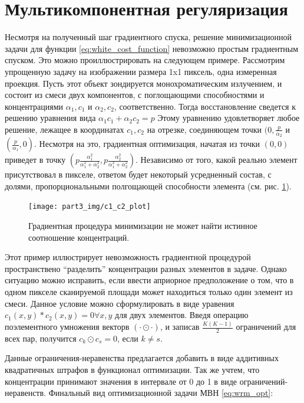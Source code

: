 \section{Мультикомпонентная регуляризация}
Несмотря на полученный шаг градиентного спуска, решение минимизационной задачи для функции \eqref{eq:white_cost_function} невозможно простым градиентным спуском.
Это можно проиллюстрировать на следующем примере.
Рассмотрим упрощенную задачу на изображении размера 1x1 пиксель, одна измеренная проекция. 
Пусть этот объект зондируется монохроматическим излучением, и состоит из смеси двух компонентов, с поглощающими способностями и концентрациями $\alpha_1, c_1$ и $\alpha_2, c_2$, соответственно.
Тогда восстановление сведется к решению уравнения вида $ \alpha_1 c_1 + \alpha_2 c_2 = p$
Этому уравнению удовлетворяет любое решение, лежащее в координатах $c_1, c_2$ на отрезке, соединяющем точки $(0, \frac{p}{\alpha_2}$ и $(\frac{p}{\alpha_1}, 0)$.
Несмотря на это, градиентная оптимизация, начатая из точки $(0, 0)$ приведет в точку $(p\frac{\alpha_1^2}{\alpha_1^2 + \alpha_2^2}, p\frac{\alpha_2^2}{\alpha_1^2 + \alpha_2^2})$.
Независимо от того, какой реально элемент присутствовал в пикселе, ответом будет некоторый усредненный состав, с долями, пропорциональными полгощающей способности элемента (см. рис. \ref{fig:c1_c2_plot}).

\begin{figure}
  \centering
  \texttt{[image: part3\_img/c1\_c2\_plot]}
  \caption{Градиентная процедура минимизации не может найти истинное соотношение концентраций.}
  \label{fig:c1_c2_plot}
\end{figure}

Этот пример иллюстрирует невозможность градиентной процедурой пространствено ``разделить'' концентрации разных элементов в задаче.
Однако ситуацию можно исправить, если ввести априорное предположение о том, что в одном пикселе сканируемой площади может находиться только один элемент из смеси.
Данное условие можно сформулировать в виде уравения $c_1(x,y) * c_2(x,y) = 0 \forall x,y$ для двух элементов.
Введя операцию поэлементного умножения векторв $(\cdot \odot \cdot)$, и записав $\frac{K(K-1)}{2}$ ограничений для всех пар, получится $c_{k} \odot c_{s} = 0$, если $k \neq s$.

Данные ограничения-неравенства предлагается добавить в виде аддитивных квадратичных штрафов в функционал оптимизации.
Так же учтем, что концентрации принимают значения в интервале от 0 до 1 в виде ограничений-неравенств.
Финальный вид оптимизационной задачи МВН \eqref{eq:wrm_opt}:

